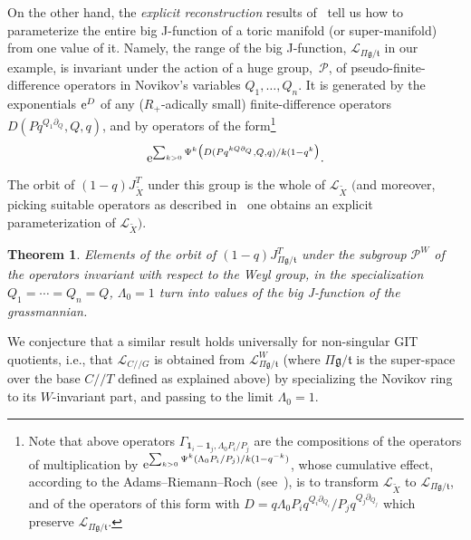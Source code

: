 \documentclass[pdftex]{sigma}
\numberwithin{equation}{section}
\newtheorem{Theorem}{Theorem}[section]
\def\L{\mathcal L}
\def\1{\mathbf 1}
\def\tilde{\widetilde}
\def\p{\partial}
\begin{document}
On the other hand, the {\em explicit reconstruction} results of~\cite{Givental:perm8} tell us how to parameterize the entire big J-function of a toric manifold (or super-manifold) from one value of it. Namely, the range of the big J-function, $\L_{\Pi \mathfrak{g}/\mathfrak{t}}$ in our example, is invariant under the action of a huge group,~${\mathcal P}$, of pseudo-finite-difference operators in Novikov's variables $Q_1,\dots,Q_n$. It is generated by the exponentials ${\rm e}^D$ of any ($R_+$-adically small) finite-difference operators $D(Pq^{Q_1\p_Q}, Q, q)$, and by operators of the form\footnote{Note that above operators $\Gamma_{\1_i-\1_j,\Lambda_0 P_i/P_j}$ are the compositions of the operators of multiplication by ${\rm e}^{\sum_{k>0}\Psi^k(\Lambda_0 P_i/P_j)/k(1-q^{-k})}$, whose cumulative effect, according to the Adams--Riemann--Roch (see~\cite{Givental:perm10}), is to transform $\L_{\tilde{X}}$ to $\L_{\Pi \mathfrak{g}/\mathfrak{t}}$, and of the operators of this form with $D= q\Lambda_0 P_iq^{Q_i\p_{Q_i}}/P_jq^{Q_j\p_{Q_j}}$ which preserve $\L_{\Pi \mathfrak{g}/\mathfrak{t}}$.}
\[
{\rm e}^{ \sum_{k>0} \Psi^k\big(D(Pq^{kQ\p_Q},Q,q)/k(1-q^k\big)}.
\]
The orbit of $(1-q) J^T_{\tilde{X}}$ under this group is the whole of $\L_{\tilde{X}}$ $\big($and moreover, picking suitable operators as described in~\cite{Givental:perm8} one obtains an explicit parameterization of $\L_{\tilde{X}}\big)$.

\begin{Theorem}\label{thm3}
Elements of the orbit of $(1-q) J^T_{\Pi \mathfrak{g}/\mathfrak{t}}$ under the subgroup ${\mathcal P}^W$ of the operators invariant with respect to the Weyl group, in the specialization $Q_1=\cdots=Q_n=Q$, $\Lambda_0=1$ turn into values of the big J-function of the grassmannian.
\end{Theorem}

We conjecture that a similar result holds universally for non-singular GIT quotients, i.e., that $\L_{C//G}$ is obtained from $\L_{\Pi \mathfrak{g}/\mathfrak{t}}^W$ (where $\Pi \mathfrak{g}/\mathfrak{t}$ is the super-space over the base $C//T$ defined as explained above) by specializing the Novikov ring to its $W$-invariant part, and passing to the limit $\Lambda_0=1$.
\end{document}
